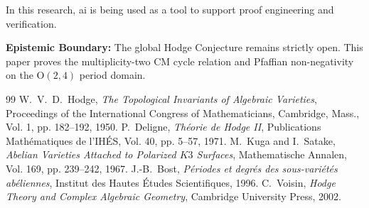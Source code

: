 \documentclass[11pt,a4paper]{article}
\theoremstyle{definition}
\begin{document}
In this research, ai is being used as a tool to support proof engineering and verification.

\textbf{Epistemic Boundary:} The global Hodge Conjecture remains strictly open. This paper proves the multiplicity-two CM cycle relation and Pfaffian non-negativity on the $\mathrm{O}(2,4)$ period domain.


\begin{thebibliography}{99}
 W.~V.~D.~Hodge, \emph{The Topological Invariants of Algebraic Varieties}, Proceedings of the International Congress of Mathematicians, Cambridge, Mass., Vol. 1, pp. 182--192, 1950.
 P.~Deligne, \emph{Th\'eorie de Hodge II}, Publications Math\'ematiques de l'IH\'ES, Vol. 40, pp. 5--57, 1971.
 M.~Kuga and I.~Satake, \emph{Abelian Varieties Attached to Polarized $K3$ Surfaces}, Mathematische Annalen, Vol. 169, pp. 239--242, 1967.
 J.-B.~Bost, \emph{P\'eriodes et degr\'es des sous-vari\'et\'es ab\'eliennes}, Institut des Hautes \'Etudes Scientifiques, 1996.
 C.~Voisin, \emph{Hodge Theory and Complex Algebraic Geometry}, Cambridge University Press, 2002.
\end{thebibliography}
\end{document}
